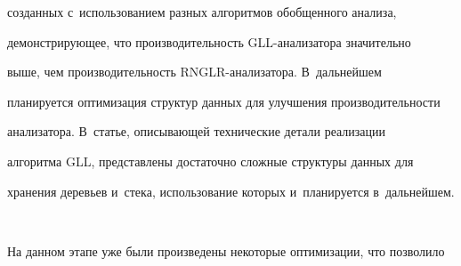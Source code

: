 созданных с~использованием разных алгоритмов обобщенного анализа,


демонстрирующее, что производительность GLL-ана\-ли\-за\-то\-ра значительно


выше, чем производительность RNGLR-ана\-ли\-за\-то\-ра. В~дальнейшем


планируется оптимизация структур данных для улучшения производительности


анализатора. В~статье, описывающей технические детали реализации


алгоритма GLL, представлены достаточно сложные структуры данных для


хранения деревьев и~стека, использование которых и~планируется в~дальнейшем.





\pagebreak





\





\vspace*{-12pt}













На данном этапе уже были произведены некоторые оптимизации, что позволило


